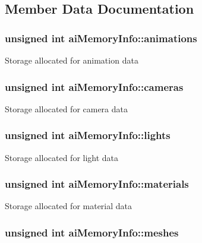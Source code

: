 \subsection{Member Data Documentation}
\hypertarget{structai_memory_info_af82394dc3a17a644061ed647817efa68}{
\subsubsection[{animations}]{\setlength{\rightskip}{0pt plus 5cm}unsigned int ai\-Memory\-Info\-::animations}}\label{structai_memory_info_af82394dc3a17a644061ed647817efa68}
Storage allocated for animation data \hypertarget{structai_memory_info_a3ddd36d7eabcf989ab72cda2dd3ff015}{
\subsubsection[{cameras}]{\setlength{\rightskip}{0pt plus 5cm}unsigned int ai\-Memory\-Info\-::cameras}}\label{structai_memory_info_a3ddd36d7eabcf989ab72cda2dd3ff015}
Storage allocated for camera data \hypertarget{structai_memory_info_afcd2ccdfab49e2fce989413a362b8d35}{
\subsubsection[{lights}]{\setlength{\rightskip}{0pt plus 5cm}unsigned int ai\-Memory\-Info\-::lights}}\label{structai_memory_info_afcd2ccdfab49e2fce989413a362b8d35}
Storage allocated for light data \hypertarget{structai_memory_info_a08b2ccd0cef8dec36e47fc1beeb168f1}{
\subsubsection[{materials}]{\setlength{\rightskip}{0pt plus 5cm}unsigned int ai\-Memory\-Info\-::materials}}\label{structai_memory_info_a08b2ccd0cef8dec36e47fc1beeb168f1}
Storage allocated for material data \hypertarget{structai_memory_info_ac24ed2b3c141f043765b6e34783d1e24}{
\subsubsection[{meshes}]{\setlength{\rightskip}{0pt plus 5cm}unsigned int ai\-Memory\-Info\-::meshes}}\label{structai_memory_info_ac24ed2b3c141f043765b6e34783d1e24}
